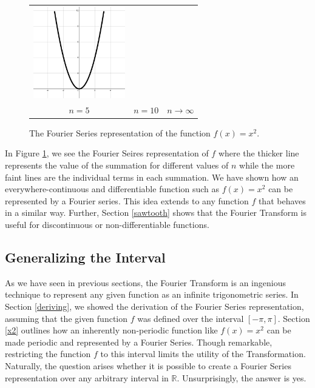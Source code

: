 \documentclass[11pt]{amsart}
\theoremstyle{plain}
\theoremstyle{definition}
\newcommand{\R}{\mathbb R}
\begin{document}
\begin{figure}[ht!]
\begin{tabular}{ccc}
  \includegraphics[width=40mm]{Images/simple_full.png} \\
  $n=5$ & $n=10$ & $n\to\infty$\\[6pt]
\end{tabular}
\caption{\centering The Fourier Series representation of the function $f(x)=x^2$.}
\label{fig:simple}
\end{figure}

In Figure \ref{fig:simple}, we see the Fourier Seires representation of $f$ where the thicker line represents the value of the summation for different values of $n$ while the more faint lines are the individual terms in each summation. We have shown how an everywhere-continuous and differentiable function such as $f(x)=x^2$ can be represented by a Fourier series. This idea extends to any function $f$ that behaves in a similar way. Further, Section \ref{sawtooth} shows that the Fourier Transform is useful for discontinuous or non-differentiable functions.

\subsection{Generalizing the Interval}\label{bounds}
    As we have seen in previous sections, the Fourier Transform is an ingenious technique to represent any given function as an infinite trigonometric series. In Section \ref{deriving}, we showed the derivation of the Fourier Series representation, assuming that the given function $f$ was defined over the interval $[-\pi,\pi]$. Section \ref{x2} outlines how an inherently non-periodic function like $f(x) = x^2$ can be made periodic and represented by a Fourier Series. Though remarkable, restricting the function $f$ to this interval limits the utility of the Transformation. Naturally, the question arises whether it is possible to create a Fourier Series representation over any arbitrary interval in $\R$. Unsurprisingly, the answer is yes.  
\end{document}

